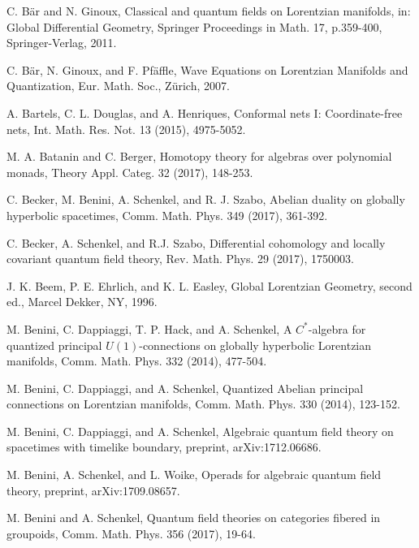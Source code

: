 \documentclass[11pt]{amsbook}
\numberwithin{section}{chapter}
\numberwithin{subsection}{section}
\numberwithin{equation}{section}
\theoremstyle{plain}
\theoremstyle{definition}
\begin{document}

\begin{thebibliography}{AAAAAA}
C. B\"{a}r and N. Ginoux, Classical and quantum fields on Lorentzian manifolds, in: Global Differential Geometry, Springer Proceedings in Math. 17, p.359-400, Springer-Verlag, 2011.

C. B\"{a}r, N. Ginoux, and F. Pf\"{a}ffle, Wave Equations on Lorentzian Manifolds and Quantization, Eur. Math. Soc., Z\"{u}rich,  2007.

A. Bartels, C. L. Douglas, and A. Henriques, Conformal nets I: Coordinate-free nets, Int. Math. Res. Not. 13 (2015), 4975-5052. 

M. A. Batanin and C. Berger, Homotopy theory for algebras over polynomial monads, Theory Appl. Categ. 32 (2017), 148-253.

C. Becker, M. Benini, A. Schenkel, and R. J. Szabo, Abelian duality on globally
hyperbolic spacetimes, Comm. Math. Phys. 349 (2017), 361-392.

C. Becker, A. Schenkel, and R.J. Szabo, Differential cohomology and locally covariant quantum field theory, Rev. Math. Phys. 29 (2017), 1750003.

J. K. Beem, P. E. Ehrlich, and K.  L. Easley, Global Lorentzian Geometry, second ed., Marcel Dekker, NY, 1996.

M. Benini, C. Dappiaggi, T. P. Hack, and A. Schenkel, A $C^*$-algebra for quantized principal $U(1)$-connections on globally hyperbolic Lorentzian manifolds, Comm. Math. Phys. 332 (2014), 477-504.

M. Benini, C. Dappiaggi, and A. Schenkel, Quantized Abelian principal connections on Lorentzian manifolds, Comm. Math. Phys. 330 (2014), 123-152.

M. Benini, C. Dappiaggi, and A. Schenkel, Algebraic quantum field theory on spacetimes with timelike boundary, preprint, arXiv:1712.06686.

M. Benini, A. Schenkel, and L. Woike, Operads for algebraic quantum field theory, preprint, arXiv:1709.08657.

M. Benini and A. Schenkel, Quantum field theories on categories fibered in groupoids, Comm. Math. Phys. 356 (2017), 19-64.


\end{thebibliography}
\end{document}
